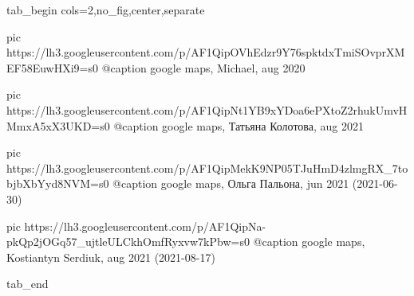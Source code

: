  
 
 
 
 


\ifcmt
  tab_begin cols=2,no_fig,center,separate

     pic https://lh3.googleusercontent.com/p/AF1QipOVhEdzr9Y76spktdxTmiSOvprXMEF58EuwHXi9=s0
		 @caption google maps, Michael, aug 2020

		 pic https://lh3.googleusercontent.com/p/AF1QipNt1YB9xYDoa6ePXtoZ2rhukUmvHMmxA5xX3UKD=s0
		 @caption google maps, Татьяна Колотова, aug 2021

		 pic https://lh3.googleusercontent.com/p/AF1QipMekK9NP05TJuHmD4zlmgRX_7tobjbXbYyd8NVM=s0
		 @caption google maps, Ольга Пальона, jun 2021 (2021-06-30)

		 pic https://lh3.googleusercontent.com/p/AF1QipNa-pkQp2jOGq57_ujtleULCkhOmfRyxvw7kPbw=s0
		 @caption google maps, Kostiantyn Serdiuk, aug 2021 (2021-08-17)

  tab_end
\fi


